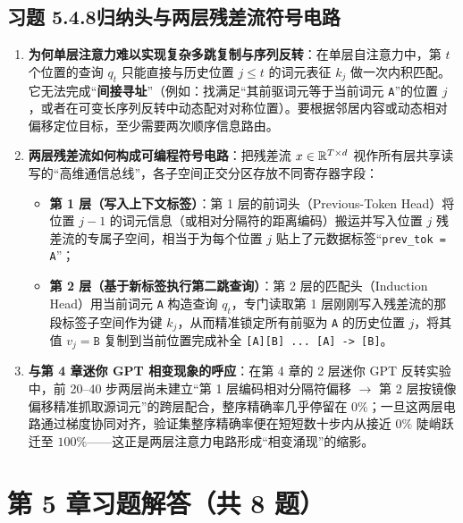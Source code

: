 \subsection*{习题 5.4.8\quad 归纳头与两层残差流符号电路}
\begin{enumerate}[label=(\arabic*), leftmargin=1.8em]
  \item \textbf{为何单层注意力难以实现复杂多跳复制与序列反转}：在单层自注意力中，第 $t$ 个位置的查询 $q_t$ 只能直接与历史位置 $j \le t$ 的词元表征 $k_j$ 做一次内积匹配。它无法完成“\textbf{间接寻址}”（例如：找满足“其前驱词元等于当前词元 \texttt{A}”的位置 $j$，或者在可变长序列反转中动态配对对称位置）。要根据邻居内容或动态相对偏移定位目标，至少需要两次顺序信息路由。
  \item \textbf{两层残差流如何构成可编程符号电路}：把残差流 $x \in \mathbb{R}^{T \times d}$ 视作所有层共享读写的“高维通信总线”，各子空间正交分区存放不同寄存器字段：
  \begin{itemize}
    \item \textbf{第 1 层（写入上下文标签）}：第 1 层的前词头（Previous-Token Head）将位置 $j-1$ 的词元信息（或相对分隔符的距离编码）搬运并写入位置 $j$ 残差流的专属子空间，相当于为每个位置 $j$ 贴上了元数据标签“\texttt{prev\_tok = A}”；
    \item \textbf{第 2 层（基于新标签执行第二跳查询）}：第 2 层的匹配头（Induction Head）用当前词元 \texttt{A} 构造查询 $q_t$，专门读取第 1 层刚刚写入残差流的那段标签子空间作为键 $k_j$，从而精准锁定所有前驱为 \texttt{A} 的历史位置 $j$，将其值 $v_j = \texttt{B}$ 复制到当前位置完成补全 \texttt{[A][B] ... [A] -> [B]}。
  \end{itemize}
  \item \textbf{与第 4 章迷你 GPT 相变现象的呼应}：在第 4 章的 2 层迷你 GPT 反转实验中，前 20--40 步两层尚未建立“第 1 层编码相对分隔符偏移 $\to$ 第 2 层按镜像偏移精准抓取源词元”的跨层配合，整序精确率几乎停留在 $0\%$；一旦这两层电路通过梯度协同对齐，验证集整序精确率便在短短数十步内从接近 $0\%$ 陡峭跃迁至 $100\%$——这正是两层注意力电路形成“相变涌现”的缩影。
\end{enumerate}

\section*{第 5 章习题解答（共 8 题）}

